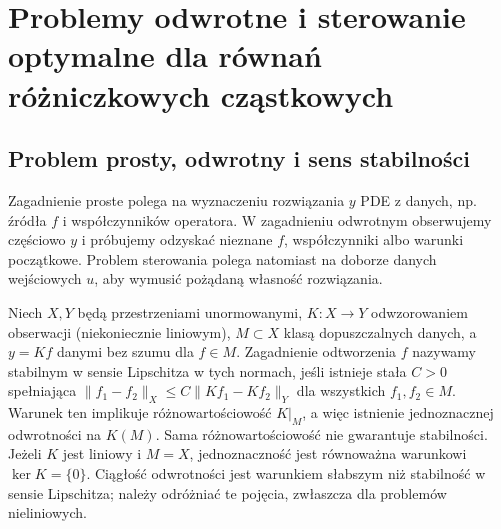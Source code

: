 \chapter[Problemy odwrotne i sterowanie PDE]{Problemy odwrotne i sterowanie optymalne dla równań różniczkowych cząstkowych}
\label{chap:pde32}

\section{Problem prosty, odwrotny i sens stabilności}
Zagadnienie proste polega na wyznaczeniu rozwiązania $y$ PDE
z danych, np. źródła $f$ i współczynników operatora.
W zagadnieniu odwrotnym obserwujemy częściowo $y$ i próbujemy
odzyskać nieznane $f$, współczynniki albo warunki początkowe.
Problem sterowania polega natomiast na doborze danych wejściowych
$u$, aby wymusić pożądaną własność rozwiązania.

\begin{definicja}
Niech $X,Y$ będą przestrzeniami unormowanymi, $K:X\to Y$
odwzorowaniem obserwacji (niekoniecznie liniowym),
$M\subset X$ klasą dopuszczalnych danych, a $y=Kf$
danymi bez szumu dla $f\in M$.
Zagadnienie odtworzenia $f$ nazywamy stabilnym
w sensie Lipschitza w tych normach, jeśli istnieje
stała $C>0$ spełniająca
$\|f_1-f_2\|_X\le C\|Kf_1-Kf_2\|_Y$ dla wszystkich
$f_1,f_2\in M$.
Warunek ten implikuje różnowartościowość $K|_M$,
a więc istnienie jednoznacznej odwrotności na $K(M)$.
Sama różnowartościowość nie gwarantuje stabilności.
Jeżeli $K$ jest liniowy i $M=X$, jednoznaczność
jest równoważna warunkowi $\ker K=\{0\}$.
Ciągłość odwrotności jest warunkiem słabszym niż
stabilność w sensie Lipschitza; należy odróżniać
te pojęcia, zwłaszcza dla problemów nieliniowych.
\end{definicja}

